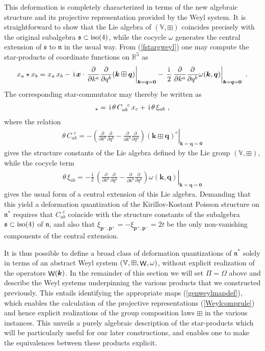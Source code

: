 \documentclass[11pt,a4paper]{article}
\DeclareMathOperator{\weyl}{{\sf W}}                   %
\newcommand{\comp}{\boxplus}                            %
\def\d{\partial}
\newcommand{\1}{\mathbb{1}}
\newcommand{\mbf}[1]{{\boldsymbol {#1} }}
\def\ii{{\,{\rm i}\,}}
\def\mx{{\mbf x}}
\def\mk{{\mbf k}}
\def\mq{{\mbf q}}
\def\mbp{{\mbf p}}
\def\mfn{{\mathfrak n}}
\def\mfs{{\mathfrak s}}
\def\mbbV{{\mathbb V}}
\newcommand{\real}{{\mathbb R}} %
\def\d{\partial}
\newcommand{\beq}{\begin{eqnarray}}
\newcommand{\eeq}{\end{eqnarray}}
\begin{document}
This deformation is completely characterized in terms of the
new algebraic structure and its projective representation provided by
the Weyl system. It is straightforward to show
that the Lie algebra of $(\mathbb{V},\comp)$ coincides precisely with
the original subalgebra $\mfs\subset{\rm iso}(4)$, while the cocycle $\omega$
generates the central extension of $\mfs$ to $\mfn$ in the
usual way. From (\ref{fstargweyl}) one may compute the
star-products of coordinate functions on $\real^5$ as
\beq
x_a\star x_b=x_a\,x_b-\ii\mx\cdot\left.\frac\d{\d k^a}\frac\d
{\d q^b}(\mk\comp\mq)\right|_{\mk=\mq=\mbf0}-\left.\frac\ii2\,
\frac\d{\d k^a}\frac\d
{\d q^b}\omega(\mk,\mq)\right|_{\mk=\mq=\mbf0} \ .
\label{xastarxbweyl}\eeq
The corresponding star-commutator may thereby be written as
\beq
[x_a,x_b]_\star=\ii\theta\,C_{ab}^{~~c}\,x_c+\ii\theta\,\xi_{ab} \ ,
\label{xaxbstarcommxi}\eeq
where the relation
\beq
\theta\,C_{ab}^{~~c}=-\left.\left(\frac\d{\d k^a}\frac\d
{\d q^b}-\frac\d{\d k^b}\frac\d
{\d q^a}\right)(\mk\comp\mq)^c\right|_{\mk=\mq=\mbf0}
\label{Cabccomp}\eeq
gives the structure constants of the Lie algebra defined by the Lie
group $(\mathbb{V},\comp)$, while the cocycle term
\beq
\theta\,\xi_{ab}=-\frac12\,\left.\left(\frac\d{\d k^a}\frac\d
{\d q^b}-\frac\d{\d k^b}\frac\d
{\d q^a}\right)\omega(\mk,\mq)\right|_{\mk=\mq=\mbf0}
\label{cocycleterm}\eeq
gives the usual form of a central extension of this Lie
algebra. Demanding that this yield a deformation quantization of the
Kirillov-Kostant Poisson structure on $\mfn^*$ requires that
$C_{ab}^{~~c}$ coincide with the structure constants of the subalgebra
$\mfs\subset{\rm iso}(4)$ of $\mfn$, and also that
$\xi_{\mbp^-,\mbp^+}=-\xi_{\mbp^+,\mbp^-}=2t$ be the only
non-vanishing components of the central extension.

It is thus possible to define a broad class of deformation quantizations of
$\mfn^*$ solely in terms of an abstract Weyl system
$(\mbbV,\comp,\weyl,\omega)$, without explicit realization of the
operators $\weyl(\mk)$. In the remainder of this section we will
set $\Pi=\Omega$ above and describe the Weyl systems
underpinning the various products that we constructed previously. This
entails identifying the appropriate maps (\ref{genweylmapdef}), which
enables the calculation of the projective representations
(\ref{Weylcomprule}) and hence explicit realizations of the group
composition laws $\comp$ in the various instances. This unveils a
purely algebraic description of the star-products which will be
particularly useful for our later constructions, and enables one to
make the equivalences between these products explicit.
\end{document}
